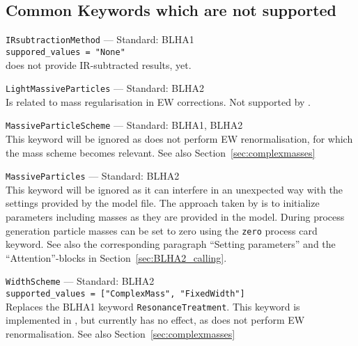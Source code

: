 %
%
%

\subsection{Common Keywords which are not supported}
\begin{basedescript}{\desclabelstyle{\pushlabel}}
    \item[\hspace{-1em}]\colorbox{gray!30}{\lstinline[style=in]|IRsubtractionMethod|} --- Standard: BLHA1\vspace{0.1cm}\\
        \lstinline[style=in]|suppored_values = "None"|\\
        \gosam does not provide IR-subtracted results, yet.
    \item[\hspace{-1em}]\colorbox{gray!30}{\lstinline[style=in]|LightMassiveParticles|} --- Standard: BLHA2\vspace{0.1cm}\\
        Is related to mass regularisation in EW corrections. Not supported by \gosam.
    \item[\hspace{-1em}]\colorbox{gray!30}{\lstinline[style=in]|MassiveParticleScheme|} --- Standard: BLHA1, BLHA2 \vspace{0.1cm}\\
        This keyword will be ignored as \gosam does not perform EW renormalisation, for which the mass scheme becomes relevant. See also Section~\ref{sec:complexmasses}
    \item[\hspace{-1em}]\colorbox{gray!30}{\lstinline[style=in]|MassiveParticles|} --- Standard: BLHA2\vspace{0.1cm}\\
        This keyword will be ignored as it can interfere in an unexpected way with the settings provided by the model file. The approach taken by \gosam is to initialize parameters including masses as they are provided in the model. During process generation particle masses can be set to zero using the \texttt{zero} process card keyword. See also the corresponding paragraph ``Setting parameters'' and the ``Attention''-blocks in Section~\ref{sec:BLHA2_calling}.
    \item[\hspace{-1em}]\colorbox{gray!30}{\lstinline[style=in]|WidthScheme|} --- Standard: BLHA2\vspace{0.1cm}\\
        \lstinline[style=in]|supported_values = ["ComplexMass", "FixedWidth"]|\\
        Replaces the BLHA1 keyword \texttt{ResonanceTreatment}. This keyword is implemented in \gosam, but currently has no effect, as \gosam does not perform EW renormalisation. See also Section~\ref{sec:complexmasses}
\end{basedescript}
